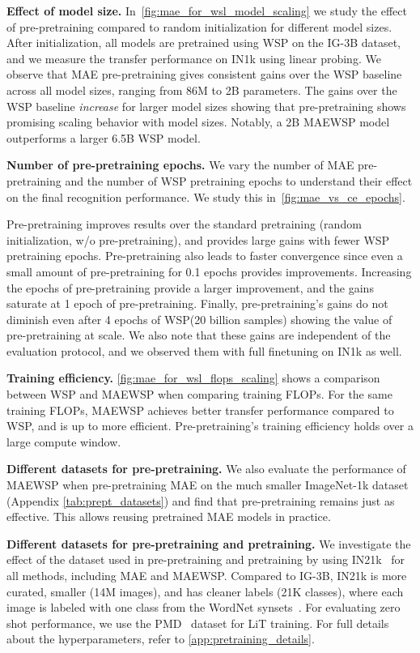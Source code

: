 \documentclass[10pt,twocolumn,letterpaper]{article}
\newcommand{\prept}{pre-pretraining\xspace}
\newcommand{\Prept}{Pre-pretraining\xspace}
\newcommand{\lit}{LiT\xspace}
\newcommand{\mae}{MAE\xspace}
\newcommand{\ce}{WSP\xspace}
\newcommand{\ours}{MAEWSP\xspace}  \newcommand{\oursig}{\ours{}\textsubscript{IG}\xspace}
\newcommand{\igSizeShort}{IG-3B\xspace}
\newcommand{\inetOneK}{ImageNet-1k\xspace}
\newcommand{\inetOneKShort}{IN1k\xspace}
\newcommand{\inetFullShort}{IN21k\xspace}
\newcommand{\pmd}{PMD\xspace}
\begin{document}
\par \noindent \textbf{Effect of model size.}
In~\cref{fig:mae_for_wsl_model_scaling} we study the effect of \prept compared to random initialization for different model sizes.
After initialization, all models are pretrained using \ce on the \igSizeShort dataset, and we measure the transfer performance on \inetOneKShort using linear probing.
We observe that \mae \prept gives consistent gains over the \ce baseline across all model sizes, ranging from 86M to 2B parameters.
The gains over the \ce baseline \emph{increase} for larger model sizes showing that \prept shows promising scaling behavior with model sizes.
Notably, a 2B \ours model outperforms a larger 6.5B \ce model.

\par \noindent \textbf{Number of \prept epochs.}
We vary the number of \mae \prept and the number of \ce pretraining epochs to understand their effect on the final recognition performance.
We study this in~\cref{fig:mae_vs_ce_epochs}.

\Prept improves results over the standard pretraining (random initialization, w/o \prept), and provides large gains with fewer \ce pretraining epochs.
\Prept also leads to faster convergence since even a small amount of \prept for 0.1 epochs provides improvements.
Increasing the epochs of \prept provide a larger improvement, and the gains saturate at 1 epoch of \prept.
Finally, \prept's gains do not diminish even after 4 epochs of \ce (20 billion samples) showing the value of \prept at scale.
We also note that these gains are independent of the evaluation protocol, and we observed them with full finetuning on \inetOneKShort as well.


\par \noindent \textbf{Training efficiency.}
\cref{fig:mae_for_wsl_flops_scaling} shows a comparison between \ce and \ours when comparing training FLOPs.
For the same training FLOPs, \ours achieves better transfer performance compared to \ce, and is up to  more efficient.
\Prept's training efficiency holds over a large  compute window.

\par \noindent \textbf{Different datasets for \prept.}
We also evaluate the performance of \ours when \prept \mae on the much smaller \inetOneK dataset (Appendix 
\cref{tab:prept_datasets}) and find that \prept remains just as effective. This allows reusing pretrained \mae models in practice.

\par \noindent \textbf{Different datasets for \prept and pretraining.}
We investigate the effect of the dataset used in \prept and pretraining by using \inetFullShort~\cite{deng2009imagenet} for all methods, including \mae and \ours.
Compared to \igSizeShort, \inetFullShort is more curated, smaller (14M images), and has cleaner labels (21K classes), where each image is labeled with one class from the WordNet synsets~\cite{miller1995wordnet}.
For evaluating
zero shot performance, we use the \pmd~\cite{singh2022flava} dataset for \lit training.
For full details about the hyperparameters, refer to \cref{app:pretraining_details}.
\end{document}
